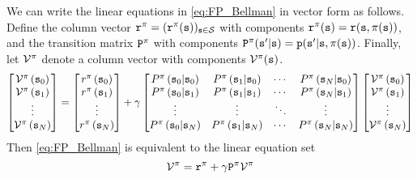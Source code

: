 We can write the linear equations in \eqref{eq:FP_Bellman} in vector
form as follows. Define the column vector ${{\tt r}^\pi } =
{({{\tt r}^\pi }({\tt s}))_{{\tt s} \in \mathcal{S}}}$ with components
${{\tt r}^\pi }({\tt s}) = {\tt r}({\tt s},\pi ({\tt s}))$, and the
transition matrix ${{\tt P}^\pi }$ with components ${{\tt P}^\pi
}({\tt s}'|{\tt s}) = {\tt p}({\tt s}'|{\tt s},\pi ({\tt s}))$. Finally,
let ${\mathcal{V}^\pi }$ denote a column vector with components
${\mathcal{V}^\pi }({\tt s})$. 
\[
\begin{bmatrix}\mathcal{V}^{\pi}\left({\tt s}_{0}\right)\\
\mathcal{V}^{\pi}\left({\tt s}_{1}\right)\\
\vdots\\
\mathcal{V}^{\pi}\left({\tt s}_{N}\right)
\end{bmatrix}=\begin{bmatrix}r^{\pi}\left({\tt s}_{0}\right)\\
r^{\pi}\left({\tt s}_{1}\right)\\
\vdots\\
r^{\pi}\left({\tt s}_{N}\right)
\end{bmatrix}+\gamma\begin{bmatrix}P^{\pi}\left({\tt s}_{0}|{\tt s}_{0}\right) & P^{\pi}\left({\tt s}_{1}|{\tt s}_{0}\right) & \cdots & P^{\pi}\left({\tt s}_{N}|{\tt s}_{0}\right)\\
P^{\pi}\left({\tt s}_{0}|{\tt s}_{1}\right) & P^{\pi}\left({\tt s}_{1}|{\tt s}_{1}\right) & \cdots & P^{\pi}\left({\tt s}_{N}|{\tt s}_{1}\right)\\
\vdots & \vdots & \ddots & \vdots\\
P^{\pi}\left({\tt s}_{0}|{\tt s}_{N}\right) & P^{\pi}\left({\tt s}_{1}|{\tt s}_{N}\right) & \cdots & P^{\pi}\left({\tt s}_{N}|{\tt s}_{N}\right)
\end{bmatrix}\begin{bmatrix}\mathcal{V}^{\pi}\left({\tt s}_{0}\right)\\
\mathcal{V}^{\pi}\left({\tt s}_{1}\right)\\
\vdots\\
\mathcal{V}^{\pi}\left({\tt s}_{N}\right)
\end{bmatrix}
\]
Then \eqref{eq:FP_Bellman} is
equivalent to the linear equation set
\begin{equation}\label{eq:PF_Bellman_vector}
{\mathcal{V}^\pi} = {{\tt r}^\pi } + \gamma {{\tt P}^\pi}{\mathcal{V}^\pi}
\end{equation}

